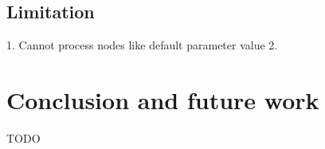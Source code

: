 \documentclass[letterpaper,12pt,onecolumn,final]{report}
\begin{document}
\section{Limitation}

1. Cannot process nodes like default parameter value
2. 
\chapter{Conclusion and future work}
\label{chap:conclusion}

TODO


\clearpage
{}
{}  %
\singlespacing %





\appendix
\setcounter{table}{0}		%
\setcounter{figure}{0}		%
\renewcommand{\thefigure}{\Alph{chapter}.\arabic{figure}} 	%
\renewcommand{\thetable}{\Alph{chapter}.\arabic{table}}		%
\end{document}
